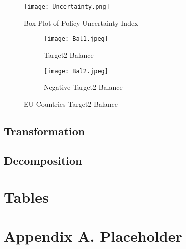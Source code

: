\documentclass[12pt]{article}
\begin{document}
\begin{figure}
  \texttt{[image: Uncertainty.png]}
  \caption{Box Plot of Policy Uncertainty Index}
  \label{fig:policy_uncertainty}
\end{figure}

\begin{figure}[h!]
  \centering
  \begin{subfigure}[b]{0.4\linewidth}
    \texttt{[image: Bal1.jpeg]}
    \caption{Target2 Balance}
  \end{subfigure}
  \begin{subfigure}[b]{0.4\linewidth}
    \texttt{[image: Bal2.jpeg]}
    \caption{Negative Target2 Balance}
  \end{subfigure}
  \caption{EU Countries Target2 Balance}
  \label{fig:target2bal}
\end{figure}

\subsection{Transformation}

\subsection{Decomposition}



\singlespacing
\setlength\bibsep{0pt}



\clearpage

\onehalfspacing

\section*{Tables} \label{sec:tab}

\section*{Appendix A. Placeholder} \label{sec:appendixa}
\end{document}
